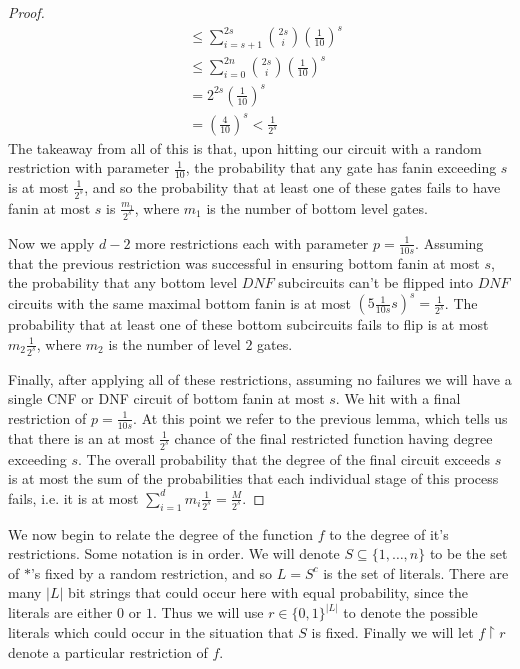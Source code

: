 \begin{proof}
\begin{align}
		 &\leq \sum_{i=s+1}^{2s} {2s \choose i} \left( \frac{1}{10}\right)^s \\
		 &\leq \sum_{i=0}^{2n} {2s \choose i} \left(\frac{1}{10}\right)^s \\
		 &= 2^{2s}\left(\frac{1}{10}\right)^s \\
		 &= \left( \frac{4}{10} \right)^s < \frac{1}{2^s}
	\end{align}
	The takeaway from all of this is that, upon hitting our circuit with a random restriction with parameter $\frac{1}{10}$, the probability that any gate has fanin exceeding $s$ is at most $\frac{1}{2^s}$, and so the probability that at least one of these gates fails to have fanin at most $s$ is $\frac{m_1}{2^s}$, where $m_1$ is the number of bottom level gates. \par 
	Now we apply $d-2$ more restrictions each with parameter $p = \frac{1}{10s}$. Assuming that the previous restriction was successful in ensuring bottom fanin at most $s$, the probability that any bottom level $DNF$ subcircuits can't be flipped into $DNF$ circuits with the same maximal bottom fanin is at most $(5\frac{1}{10s}s)^s = \frac{1}{2^s}$. The probability that at least one of these bottom subcircuits fails to flip is at most $m_2\frac{1}{2^s}$, where $m_2$ is the number of level $2$ gates. \par 
	Finally, after applying all of these restrictions, assuming no failures we will have a single CNF or DNF circuit of bottom fanin at most $s$. We hit with a final restriction of $p = \frac{1}{10s}$. At this point we refer to the previous lemma, which tells us that there is an at most $\frac{1}{2^s}$ chance of the final restricted function having degree exceeding $s$. The overall probability that the degree of the final circuit exceeds $s$ is at most the sum of the probabilities that each individual stage of this process fails, i.e. it is at most $\sum_{i=1}^d m_i \frac{1}{2^s} = \frac{M}{2^s}$. 
\end{proof}
We now begin to relate the degree of the function $f$ to the degree of it's restrictions. Some notation is in order. We will denote $S \subseteq \{1,\ldots,n\}$ to be the set of $*$'s fixed by a random restriction, and so $L = S^c$ is the set of literals. There are many $|L|$ bit strings that could occur here with equal probability, since the literals are either $0$ or $1$. Thus we will use $r \in \{0,1\}^|L|$ to denote the possible literals which could occur in the situation that $S$ is fixed. Finally we will let $f \restriction r$ denote a particular restriction of $f$. 
